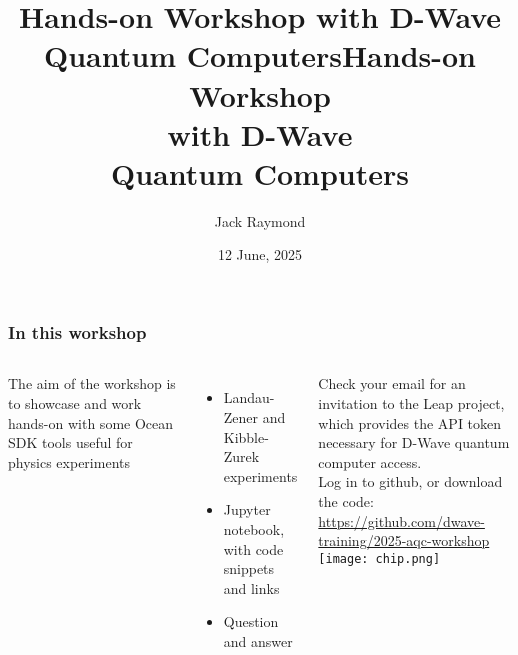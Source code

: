 \documentclass[aspectratio=169,final,11pt,forpublic]{beamer} %
\title{Hands-on Workshop with D-Wave Quantum Computers}
\date[2025]{12 June, 2025}
\author{Jack Raymond}
\begin{document}


  

\title{Hands-on Workshop \\ with D-Wave \\ Quantum Computers}
\maketitlering


\begin{frame}\frametitle{\bf In this workshop}
  \begin{columns}
    The aim of the workshop is to showcase and work hands-on with some Ocean\textsuperscript{\texttrademark} SDK tools useful for physics experiments\\
    \begin{itemize}
    \item Landau-Zener and Kibble-Zurek experiments
    \item Jupyter notebook, with code snippets and links
    \item Question and answer
    \end{itemize}
    Check your email for an invitation to the Leap project, which provides the API token necessary for D-Wave quantum computer access.\\
    Log in to github, or download the code: \href{https://github.com/dwave-training/2025-aqc-workshop}{https://github.com/dwave-training/2025-aqc-workshop}
    \texttt{[image: chip.png]}
  \end{columns}
\end{frame}
\end{document}
